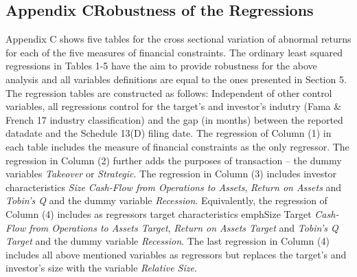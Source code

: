 \documentclass[12pt]{article}
\begin{document}
\begin{appendices}
\section*{ Appendix C\indent Robustness of the Regressions}
\noindent Appendix C shows five tables for the cross sectional variation of abnormal returns for each of the five measures of financial constraints. The ordinary least squared regressions in Tables 1-5 have the aim to provide robustness for the above analysis and all variables definitions are equal to the ones presented in Section 5. The regression tables are constructed as follows: Independent of other control variables, all regressions control for the target's and investor's indutry (Fama \& French 17 industry classification) and the gap (in months) between the reported datadate and the Schedule 13(D) filing date. The regression of Column (1) in each table includes the measure of financial constraints as the only regressor. The regression in Column (2) further adds the purposes of transaction -- the dummy variables \emph{Takeover} or \emph{Strategic}. The regression in Column (3) includes investor characteristics \emph{Size} \emph{Cash-Flow from Operations to Assets}, \emph{Return on Assets} and \emph{Tobin's Q} and the dummy variable \emph{Recession}. Equivalently, the regression of Column (4) includes as regressors target characteristics emph{Size Target} \emph{Cash-Flow from Operations to Assets Target}, \emph{Return on Assets Target} and \emph{Tobin's Q Target} and the dummy variable \emph{Recession}. The last regression in Column (4) includes all above mentioned variables as regressors but replaces the target's and investor's size with the variable \emph{Relative Size}.


\end{appendices}
\end{document}
